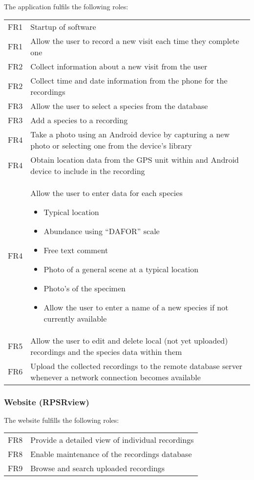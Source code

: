 	The application fulfils the following roles:\\
	\begin{tabular}{r | p{15cm}}
		FR1 & Startup of software \\
		FR1 & Allow the user to record a new visit each time they complete one \\
		FR2 & Collect information about a new visit from the user \\
		FR2 & Collect time and date information from the phone for the recordings \\
		FR3 & Allow the user to select a species from the database \\
		FR3 & Add a species to a recording \\
		FR4 & Take a photo using an Android device by capturing a new photo or selecting one from the device's library \\
		FR4 & Obtain location data from the GPS unit within and Android device to include in the recording \\
		FR4 & Allow the user to enter data for each species
		\begin{itemize}
			\item Typical location
			\item Abundance using ``DAFOR'' scale
			\item Free text comment
			\item Photo of a general scene at a typical location
			\item Photo's of the specimen
			\item Allow the user to enter a name of a new species if not currently available
		\end{itemize} \\
		FR5 & Allow the user to edit and delete local (not yet uploaded) recordings and the species data within them \\
		FR6 & Upload the collected recordings to the remote database server whenever a network connection becomes available \\
    \end{tabular}
    
\subsubsection{Website (RPSRview)}
    The website fulfills the following roles:\\    
    	\begin{tabular}{r | p{15cm}}
        	FR8 & Provide a detailed view of individual recordings \\
        	FR8 & Enable maintenance of the recordings database \\
    		FR9 & Browse and search uploaded recordings \\
        \end{tabular}
        
